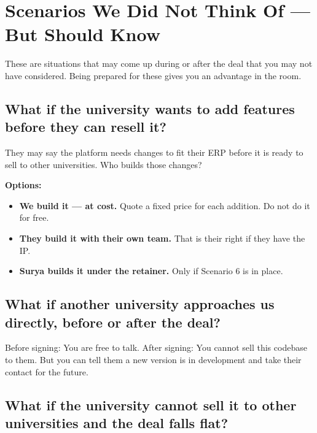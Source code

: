 \documentclass[12pt,a4paper]{article}
\begin{document}
    \newpage
    \section{Scenarios We Did Not Think Of — But Should Know}

    \begin{infobox}
    These are situations that may come up during or after the deal that you may not have considered. Being prepared for these gives you an advantage in the room.
    \end{infobox}

    \vspace{0.4cm}

    \subsection{What if the university wants to add features before they can resell it?}

    They may say the platform needs changes to fit their ERP before it is ready to sell to other universities. Who builds those changes?

    \textbf{Options:}
    \begin{itemize}[leftmargin=*, noitemsep]
        \item \textbf{We build it — at cost.} Quote a fixed price for each addition. Do not do it for free.
        \item \textbf{They build it with their own team.} That is their right if they have the IP.
        \item \textbf{Surya builds it under the retainer.} Only if Scenario 6 is in place.
    \end{itemize}

    \subsection{What if another university approaches us directly, before or after the deal?}

    Before signing: You are free to talk. After signing: You cannot sell this codebase to them. But you can tell them a new version is in development and take their contact for the future.

    \subsection{What if the university cannot sell it to other universities and the deal falls flat?}
\end{document}
